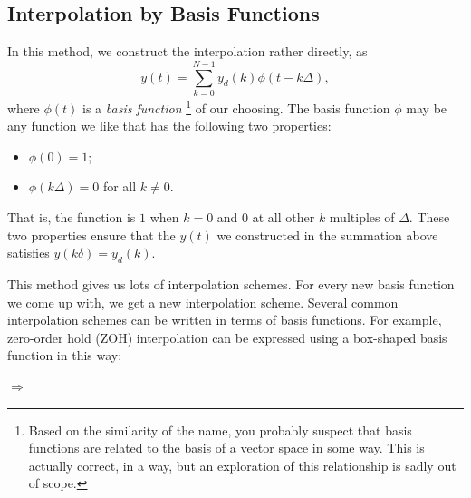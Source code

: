 \subsection{Interpolation by Basis Functions}

In this method, we construct the interpolation rather directly, as
\begin{equation*}
 y(t) = \sum_{k=0}^{N-1} y_d(k) \phi(t-k\Delta),
\end{equation*}
where $\phi(t)$ is a \emph{basis function}
\footnote{Based on the similarity of the name, you probably suspect that basis functions are related to the basis of a vector space in some way.
This is actually correct, in a way, but an exploration of this relationship is sadly out of scope.}
of our choosing. 
The basis function $\phi$ may be any function we like that has the following two properties:
\begin{itemize}
 \item $\phi(0)=1$;
 \item $\phi(k\Delta)=0$ for all $k\ne 0$.
\end{itemize}
That is, the function is $1$ when $k=0$ and $0$ at all other $k$ multiples of $\Delta$.
These two properties ensure that the $y(t)$ we constructed in the summation above satisfies $y(k\delta)=y_d(k)$.

This method gives us lots of interpolation schemes. 
For every new basis function we come up with, we get a new interpolation scheme. 
Several common interpolation schemes can be written in terms of basis functions.
For example, zero-order hold (ZOH) interpolation can be expressed using a box-shaped basis function in this way:

\begin{center}
{\Huge $\Longrightarrow$}
\end{center}

